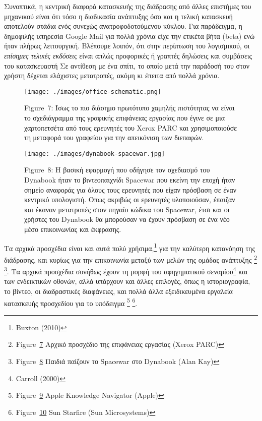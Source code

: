 \documentclass[
]{article}
\begin{document}
Συνοπτικά, η κεντρική διαφορά κατασκευής της διάδρασης από άλλες
επιστήμες του μηχανικού είναι ότι τόσο η διαδικασία ανάπτυξης όσο και η
τελική κατασκευή αποτελούν στάδια ενός συνεχώς ανατροφοδοτούμενου
κύκλου. Για παράδειγμα, η δημοφιλής υπηρεσία Google Mail για πολλά
χρόνια είχε την ετικέτα βήτα (beta) ενώ ήταν πλήρως λειτουργική.
Βλέπουμε λοιπόν, ότι στην περίπτωση του λογισμικού, οι \emph{επίσημες
τελικές εκδόσεις} είναι απλώς προφορικές ή γραπτές δηλώσεις και
συμβάσεις του κατασκευαστή Σε αντίθεση με ένα σπίτι, το οποίο μετά την
παράδοσή του στον χρήστη δέχεται ελάχιστες μετατροπές, ακόμη κι έπειτα
από πολλά χρόνια.

\leavevmode{}%
\begin{figure}
\hypertarget{fig:office-schematic}{%
\centering
\texttt{[image: ./images/office-schematic.png]}
\caption{Figure~7: Ίσως το πιο διάσημο πρωτότυπο χαμηλής πιστότητας να
είναι το σχεδιάγραμμα της γραφικής επιφάνειας εργασίας που έγινε σε μια
χαρτοπετσέτα από τους ερευνητές του Xerox PARC και χρησιμοποιούσε τη
μεταφορά του γραφείου για την απεικόνιση των
διεπαφών.}\label{fig:office-schematic}
}
\end{figure}

\leavevmode{}%
\begin{figure}
\hypertarget{fig:dynabook-spacewar}{%
\centering
\texttt{[image: ./images/dynabook-spacewar.jpg]}
\caption{Figure~8: Η βασική εφαρμογή που οδήγησε τον σχεδιασμό του
Dynabook ήταν το βιντεοπαιχνίδι Spacewar που εκείνη την εποχή ήταν
σημείο αναφοράς για όλους τους ερευνητές που είχαν πρόσβαση σε έναν
κεντρικό υπολογιστή. Όπως ακριβώς οι ερευνητές υλοποιούσαν, έπαιζαν και
έκαναν μετατροπές στον πηγαίο κώδικα του Spacewar, έτσι και οι χρήστες
του Dynabook θα μπορούσαν να έχουν πρόσβαση σε ένα νέο μέσο επικοινωνίας
και έκφρασης.}\label{fig:dynabook-spacewar}
}
\end{figure}

Τα αρχικά προσχέδια είναι και αυτά πολύ χρήσιμα,\footnote{Buxton (2010)}
για την καλύτερη κατανόηση της διάδρασης, και κυρίως για την επικοινωνία
μεταξύ των μελών της ομάδας ανάπτυξης \footnote{Figure~\protect\hyperlink{fig:office-schematic}{7}
  Αρχικό προσχέδιο της επιφάνειας εργασίας (Xerox PARC)} \footnote{Figure~\protect\hyperlink{fig:dynabook-spacewar}{8}
  Παιδιά παίζουν το Spacewar στο Dynabook (Alan Kay)}. Τα αρχικά
προσχέδια συνήθως έχουν τη μορφή του αφηγηματικού σεναρίου\footnote{Carroll
  (2000)} και των ενδεικτικών οθονών, αλλά υπάρχουν και άλλες επιλογές,
όπως η ιστοριογραφία, το βίντεο, οι διαδραστικές διαφάνειες, και πολλά
άλλα εξειδικευμένα εργαλεία κατασκευής προσχεδίου για το υπόδειγμα
\footnote{Figure~\protect\hyperlink{fig:knowledge-navigator}{9} Apple
  Knowledge Navigator (Apple)} \footnote{Figure~\protect\hyperlink{fig:starfire-video}{10}
  Sun Starfire (Sun Microsystems)}.
\end{document}
